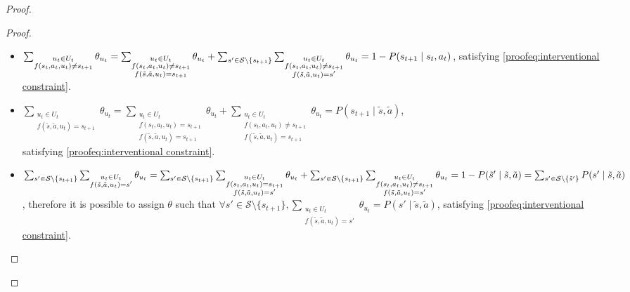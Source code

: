 \begin{proof}
\begin{proof}
\begin{itemize}
    \item $\sum_{\substack{u_t \in U_t\\f(s_t, a_t, u_t) \neq s_{t+1}}}{\theta_{u_t}} = \sum_{\substack{u_t \in U_t \\f(s_t, a_t, u_t) \neq s_{t+1} \\ f(\tilde{s}, \tilde{a}, u_t) = s_{t+1}}} \theta_{u_t} + \sum_{s' \in \mathcal{S}\setminus\{ s_{t+1}\}}\sum_{\substack{u_t \in U_t \\f(s_t, a_t, u_t) \neq s_{t+1} \\ f(\tilde{s}, \tilde{a}, u_t) = s'}}{\theta_{u_t}} \\=1 -
    P(s_{t+1} \mid s_t, a_t)$, satisfying \eqref{proofeq:interventional constraint}.

    \item $\sum_{\substack{u_t \in U_t \\f(\tilde{s}, \tilde{a}, u_t) = s_{t+1}}} \theta_{u_t} = \sum_{\substack{u_t \in U_t \\f(s_t, a_t, u_t) = s_{t+1} \\ f(\tilde{s}, \tilde{a}, u_t) = s_{t+1}}} \theta_{u_t} + \sum_{\substack{u_t \in U_t \\f(s_t, a_t, u_t) \neq s_{t+1} \\ f(\tilde{s}, \tilde{a}, u_t) = s_{t+1}}} \theta_{u_t} = P(s_{t+1} \mid \tilde{s}, \tilde{a})$, \\satisfying \eqref{proofeq:interventional constraint}.
    
    \item $\sum_{s' \in \mathcal{S}\setminus\{s_{t+1}\}}\sum_{\substack{u_t \in U_t \\f(\tilde{s}, \tilde{a}, u_t) = s'}} \theta_{u_t} = \sum_{s' \in \mathcal{S}\setminus\{ s_{t+1}\}}\sum_{\substack{u_t \in U_t \\f(s_t, a_t, u_t) = s_{t+1} \\ f(\tilde{s}, \tilde{a}, u_t) = s'}} \theta_{u_t} + \sum_{s' \in \mathcal{S}\setminus\{s_{t+1}\}}\sum_{\substack{u_t \in U_t \\f(s_t, a_t, u_t) \neq s_{t+1} \\ f(\tilde{s}, \tilde{a}, u_t) = s'}} \theta_{u_t} \\= 1 - P(\tilde{s}' \mid \tilde{s}, \tilde{a}) = \sum_{s' \in \mathcal{S}\setminus\{\tilde{s}'\}}P(s' \mid \tilde{s}, \tilde{a})$, therefore it is possible to assign $\theta$ such that $\forall s' \in \mathcal{S}\setminus\{s_{t+1}\}, \sum_{\substack{u_t \in U_t \\ f(\tilde{s}, \tilde{a}, u_t) = s'}}{\theta_{u_t}} = P(s' \mid \tilde{s}, \tilde{a})$, satisfying \eqref{proofeq:interventional constraint}.
    

\end{itemize}
\end{proof}
\end{proof}
